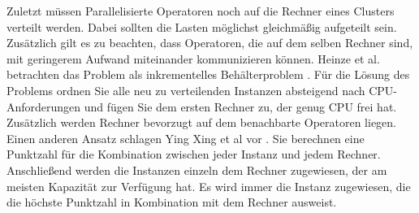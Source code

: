 Zuletzt müssen Parallelisierte Operatoren noch auf die Rechner eines Clusters verteilt werden.
Dabei sollten die Lasten möglichst gleichmäßig aufgeteilt sein.
Zusätzlich gilt es zu beachten, dass Operatoren, die auf dem selben Rechner sind, mit geringerem Aufwand miteinander kommunizieren können.
Heinze et al. betrachten das Problem als inkrementelles Behälterproblem \cite{heinze_latency-aware_2014}.
Für die Lösung des Problems ordnen Sie alle neu zu verteilenden Instanzen absteigend nach CPU-Anforderungen und fügen Sie dem ersten Rechner zu, der genug CPU frei hat.
Zusätzlich werden Rechner bevorzugt auf dem benachbarte Operatoren liegen.
Einen anderen Ansatz schlagen Ying Xing et al vor \cite{ying_xing_dynamic_2005}.
Sie berechnen eine Punktzahl für die Kombination zwischen jeder Instanz und jedem Rechner.
Anschließend werden die Instanzen einzeln dem Rechner zugewiesen, der am meisten Kapazität zur Verfügung hat.
Es wird immer die Instanz zugewiesen, die die höchste Punktzahl in Kombination mit dem Rechner ausweist.


